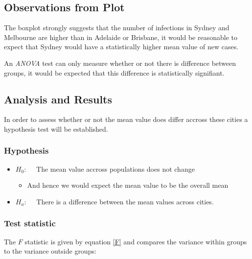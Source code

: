 \documentclass{article}
\providecommand{\tightlist}{%
  \setlength{\itemsep}{0pt}\setlength{\parskip}{0pt}}
\begin{document}
\hypertarget{observations-from-plot}{%
\subsection{Observations from Plot}\label{observations-from-plot}}

The boxplot strongly suggests that the number of infections in Sydney
and Melbourne are higher than in Adelaide or Brisbane, it would be
reasonable to expect that Sydney would have a statistically higher mean
value of new cases.

An \emph{ANOVA} test can only measure whether or not there is difference
between groups, it would be expected that this difference is
statistically signifiant.

\hypertarget{analysis-and-results}{%
\subsection{Analysis and Results}\label{analysis-and-results}}

In order to assess whether or not the mean value does differ accross
these cities a hypothesis test will be established.

\hypertarget{hypothesis}{%
\subsubsection{Hypothesis}\label{hypothesis}}

\begin{itemize}
\tightlist
\item
  \(H_0: \quad\) The mean value accross populations does not change

  \begin{itemize}
  \tightlist
  \item
    And hence we would expect the mean value to be the overall mean
  \end{itemize}
\item
  \(H_{a}: \quad\) There is a difference between the mean values across
  cities.
\end{itemize}

\hypertarget{test-statistic}{%
\subsubsection{Test statistic}\label{test-statistic}}

The \(F\) statistic is given by equation \eqref{F} and compares the
variance within groups to the variance outside groups:
\end{document}
